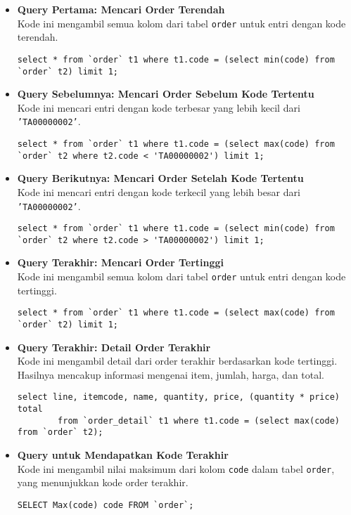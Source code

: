 \begin{itemize}
	\item \textbf{Query Pertama: Mencari Order Terendah} \\
	Kode ini mengambil semua kolom dari tabel \texttt{order} untuk entri dengan kode terendah.
	\begin{lstlisting}[style=JavaStyle]
		select * from `order` t1 where t1.code = (select min(code) from `order` t2) limit 1;
	\end{lstlisting}
	
	\item \textbf{Query Sebelumnya: Mencari Order Sebelum Kode Tertentu} \\
	Kode ini mencari entri dengan kode terbesar yang lebih kecil dari \texttt{'TA00000002'}.
	\begin{lstlisting}[style=JavaStyle]
		select * from `order` t1 where t1.code = (select max(code) from `order` t2 where t2.code < 'TA00000002') limit 1;
	\end{lstlisting}
	
	\item \textbf{Query Berikutnya: Mencari Order Setelah Kode Tertentu} \\
	Kode ini mencari entri dengan kode terkecil yang lebih besar dari \texttt{'TA00000002'}.
	\begin{lstlisting}[style=JavaStyle]
		select * from `order` t1 where t1.code = (select min(code) from `order` t2 where t2.code > 'TA00000002') limit 1;
	\end{lstlisting}
	
	\item \textbf{Query Terakhir: Mencari Order Tertinggi} \\
	Kode ini mengambil semua kolom dari tabel \texttt{order} untuk entri dengan kode tertinggi.
	\begin{lstlisting}[style=JavaStyle]
		select * from `order` t1 where t1.code = (select max(code) from `order` t2) limit 1;
	\end{lstlisting}
	
	\item \textbf{Query Terakhir: Detail Order Terakhir} \\
	Kode ini mengambil detail dari order terakhir berdasarkan kode tertinggi. Hasilnya mencakup informasi mengenai item, jumlah, harga, dan total.
	\begin{lstlisting}[style=JavaStyle]
		select line, itemcode, name, quantity, price, (quantity * price) total 
		from `order_detail` t1 where t1.code = (select max(code) from `order` t2);
	\end{lstlisting}
	
	\item \textbf{Query untuk Mendapatkan Kode Terakhir} \\
	Kode ini mengambil nilai maksimum dari kolom \texttt{code} dalam tabel \texttt{order}, yang menunjukkan kode order terakhir.
	\begin{lstlisting}[style=JavaStyle]
		SELECT Max(code) code FROM `order`;
	\end{lstlisting}
\end{itemize}

